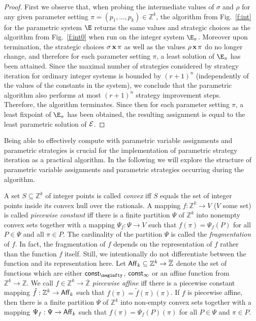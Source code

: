 \documentclass[a4paper]{easychair}
\newcommand{\ZZ}{\mathbb{Z}}
\newcommand{\ZzZ}{\overline{\mathbb Z}}
\begin{document}
\begin{proof}
First we observe that, when probing the intermediate values of $\sigma$ and $\rho$ for any given parameter setting 
$\pi= (p_1,\ldots,p_k)\in\ZZ^k$, the algorithm
from Fig.\ \ref{f:int} for the parametric system $\E$ 
returns the same values and strategic choices as the algorithm from Fig.\ \ref{f:int0} when run on the integer system $\E_\pi$.
Moreover upon termination, the strategic choices $\sigma\,{\bf x}\,\pi$ as well as
the values $\rho\,{\bf x}\,\pi$ do no longer change, and therefore for each parameter setting $\pi$, a least solution
of $\E_\pi$ has been attained.
Since the maximal number of strategies considered by strategy iteration for ordinary integer systems
is bounded by $(r+1)^n$ (independently of the values of the constants in the system), 
we conclude that the parametric algorithm also performs at most $(r+1)^n$ strategy improvement steps.
Therefore, the algorithm terminates.
Since then for each parameter setting $\pi$, a least fixpoint of $\E_\pi$ has been obtained, the resulting
assignment is equal to the least parametric solution of $\cal E$.
\end{proof}
	
\noindent
Being able to effectively compute with parametric variable assignments and 
parametric strategies is crucial for the implementation
of parametric strategy iteration as a practical algorithm.
In the following we will explore
the structure of parametric variable assignments and parametric strategies occurring 
during the algorithm.

A set $S\subseteq\ZZ^k$ of integer points is called \emph{convex} iff 
$S$ equals the set of integer points inside
its convex hull over the rationals.
A mapping $f : \ZZ^k\to V$ ($V$ some set) is called \emph{piecewise constant}
iff there is a finite
partition $\Psi$ of $\ZZ^k$ into nonempty convex sets together with a mapping $\Psi_f : \Psi \to V$ such that
$f(\pi) = \Psi_f(P)$ for all $P \in \Psi$ and all $\pi \in P$.
The cardinality of the partition $\Psi$ is called the \emph{fragmentation} of $f$.
In fact, the fragmentation of $f$ depends on the representation of $f$ rather than the function $f$ itself.
Still, we intentionally do not differentiate between the function and its representation here.
Let ${\sf Aff}_k\subseteq\ZZ^k \to\ZzZ$ denote the set of functions which are
either ${\sf const}_{\neginfty}$, ${\sf const}_\infty$ or an affine function from $\ZZ^k\to\ZZ$.
We call $f \in \ZZ^k \to\ZzZ$ \emph{piecewise affine} iff
there is a piecewise constant mapping 
$\tilde f : \ZZ^k\to{\sf Aff}_k$ such that $f(\pi) = \tilde f (\pi)(\pi)$.
If $f$ is piecewise affine, then there is a finite
partition $\Psi$ of $\ZZ^k$ into non-empty convex sets together with a mapping $\Psi_f:\Psi\to{\sf Aff}_k$ such that
$f(\pi) = \Psi_f(P)(\pi)$ for all $P \in \Psi$ and $\pi \in P$.
\end{document}
